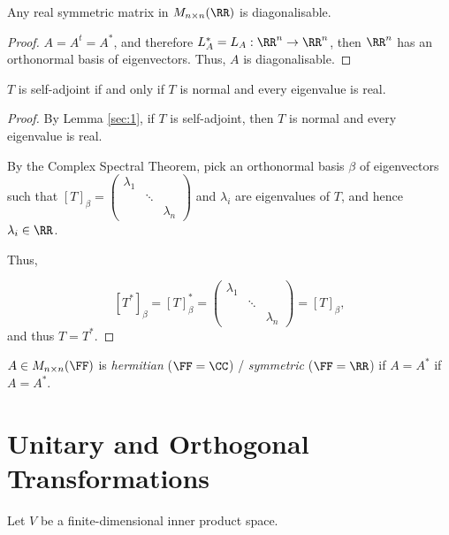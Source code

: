 \documentclass[11pt]{scrartcl}
\begin{document}
\begin{corollary}
Any real symmetric matrix in $M_{n\times n}(\RR)$ is diagonalisable.
\end{corollary}

\begin{proof}
  \hfill

  $A = A^t = A^{*}$, and therefore $L_A^{*} = L_A:\RR^n\to \RR^n$,
  then $\RR^n$ has an orthonormal basis of eigenvectors. Thus, $A$ is diagonalisable.
\end{proof}

\begin{theorem}
$T$ is self-adjoint if and only if $T$ is normal and every eigenvalue is real.
\end{theorem}

\begin{proof}
  \hfill

  By Lemma \ref{sec:1}, if $T$ is self-adjoint, then $T$ is normal and
  every eigenvalue is real.

  By the Complex Spectral Theorem, pick an orthonormal basis $\beta$ of eigenvectors such that $[T]_{\beta} = 
  \begin{pmatrix}
    \lambda_1 & &\\
    & \ddots &\\
    & & \lambda_n
  \end{pmatrix}$ and $\lambda_i$ are eigenvalues of $T$, and hence $\lambda_i\in \RR$.

  Thus,

  \[
    [T^{*}]_{\beta} = [T]^{*}_{\beta} = 
    \begin{pmatrix}
      \lambda_1 & & \\
      & \ddots &\\
      & & \lambda_{n}
    \end{pmatrix}= [T]_{\beta},
  \]
  and thus $T = T^{*}$.
  \end{proof}

  \begin{definition}
    $A \in M_{n\times n}(\FF)$ is \textit{hermitian} ($\FF = \CC$) / \textit{symmetric} ($\FF = \RR$) if $A = A^{*}$ if $A=A^{*}$.
  \end{definition}

  \section{Unitary and Orthogonal Transformations}

  Let $V$ be a finite-dimensional inner product space.
\end{document}
